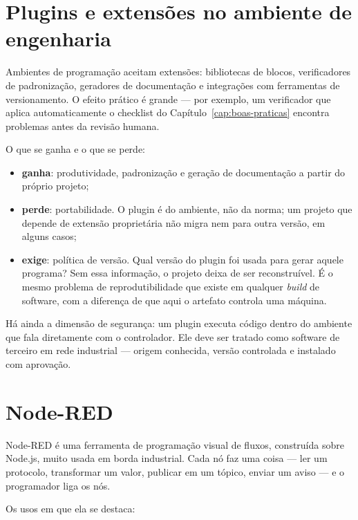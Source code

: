 \section{Plugins e extensões no ambiente de engenharia}

Ambientes de programação aceitam extensões: bibliotecas de blocos, verificadores de padronização,
geradores de documentação e integrações com ferramentas de versionamento. O efeito prático é grande
--- por exemplo, um verificador que aplica automaticamente o checklist do
Capítulo~\ref{cap:boas-praticas} encontra problemas antes da revisão humana.

O que se ganha e o que se perde:

\begin{itemize}
  \item \textbf{ganha}: produtividade, padronização e geração de documentação a partir do próprio
        projeto;
  \item \textbf{perde}: portabilidade. O plugin é do ambiente, não da norma; um projeto que depende
        de extensão proprietária não migra nem para outra versão, em alguns casos;
  \item \textbf{exige}: política de versão. Qual versão do plugin foi usada para gerar aquele
        programa? Sem essa informação, o projeto deixa de ser reconstruível. É o mesmo problema de
        reprodutibilidade que existe em qualquer \emph{build} de software, com a diferença de que
        aqui o artefato controla uma máquina.
\end{itemize}

Há ainda a dimensão de segurança: um plugin executa código dentro do ambiente que fala diretamente
com o controlador. Ele deve ser tratado como software de terceiro em rede industrial --- origem
conhecida, versão controlada e instalado com aprovação.


\section{Node-RED}

Node-RED é uma ferramenta de programação visual de fluxos, construída sobre Node.js, muito usada em
borda industrial. Cada nó faz uma coisa --- ler um protocolo, transformar um valor, publicar em um
tópico, enviar um aviso --- e o programador liga os nós.

Os usos em que ela se destaca:

